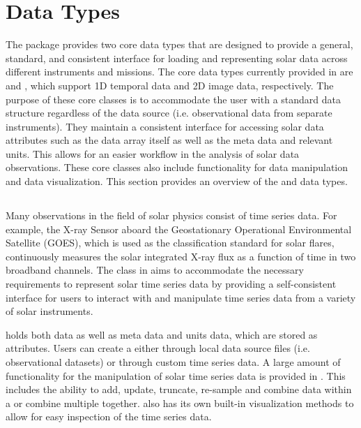  \section{Data Types}
\label{sec:data_types}

The \sunpypkg package provides two core data types that are designed to provide a general, standard, and consistent interface for loading and representing solar data across different instruments and missions.
The core data types currently provided in \sunpypkg are \Timeseries and \Map, which support 1D temporal data and 2D image data, respectively. 
The purpose of these core classes is to accommodate the user with a standard data structure regardless of the data source (i.e. observational data from separate instruments). 
They maintain a consistent interface for accessing solar data attributes such as the data array itself as well as the meta data and relevant units. 
This allows for an easier workflow in the analysis of solar data observations.
These core classes also include functionality for data manipulation and data visualization. 
This section provides an overview of the \Timeseries and \Map data types.

\subsection{\Timeseries}
\label{sec:timeseries}
Many observations in the field of solar physics consist of time series data. 
For example, the X-ray Sensor aboard the Geostationary Operational Environmental Satellite (GOES), which is used as the classification standard for solar flares, continuously measures the solar integrated X-ray flux as a function of time in two broadband channels. 
The \Timeseries class in \sunpypkg aims to accommodate the necessary requirements to represent solar time series data by providing a self-consistent interface for users to interact with and manipulate time series data from a variety of solar instruments. 


\Timeseries holds both data as well as meta data and units data, which are stored as attributes. 
Users can create a \Timeseries either through local data source files (i.e. observational datasets) or through custom time series data.
A large amount of functionality for the manipulation of solar time series data is provided in \Timeseries. 
This includes the ability to add, update, truncate, re-sample and combine data within a \Timeseries or combine multiple \Timeseries together. 
\Timeseries also has its own built-in visualization methods to allow for easy inspection of the time series data. 

